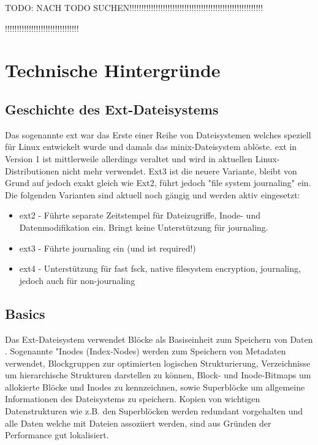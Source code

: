 

TODO: NACH TODO SUCHEN!!!!!!!!!!!!!!!!!!!!!!!!!!!!!!!!!!!!!!!!!!!!!!!!!!!!!!!!

!!!!!!!!!!!!!!!!!!!!!!!!!!!!!!!


\section{Technische Hintergründe}

\subsection{Geschichte des Ext-Dateisystems}


Das sogenannte \ac{ext} war das Erste einer Reihe von Dateisystemen welches speziell für Linux entwickelt wurde und damals das minix-Dateisystem ablöste. \ac{ext} in Version 1 ist mittlerweile allerdings veraltet und wird in aktuellen Linux-Distributionen nicht mehr verwendet. Ext3 ist die neuere Variante, bleibt von Grund auf jedoch exakt gleich wie Ext2, führt jedoch "file system journaling" ein. Die folgenden Varianten sind aktuell noch gängig und werden aktiv eingesetzt:

\begin{itemize}
	\item ext2 - Führte separate Zeitstempel für Dateizugriffe, Inode- und Datenmodifikation ein. Bringt keine Unterstützung für journaling.
	\item ext3 - Führte journaling ein (und ist required!)
	\item ext4 - Unterstützung für fast fsck, native filesystem encryption, journaling, jedoch auch für non-journaling
\end{itemize}


\subsection{Basics}

Das Ext-Dateisystem verwendet Blöcke als Basiseinheit zum Speichern von Daten \cite{Ext2.07.01.2022}. Sogenannte "Inodes (Index-Nodes) werden zum Speichern von Metadaten verwendet, Blockgruppen zur optimierten logischen Strukturierung, Verzeichnisse um hierarchische Strukturen darstellen zu können, Block- und Inode-Bitmaps um allokierte Blöcke und Inodes zu kennzeichnen, sowie Superblöcke um allgemeine Informationen des Dateisystems zu speichern. Kopien von wichtigen Datenstrukturen wie z.B. den Superblöcken werden redundant vorgehalten und alle Daten welche mit Dateien assoziiert werden, sind aus Gründen der Performance gut lokalisiert\cite{Carrier.06.01.2022}.

